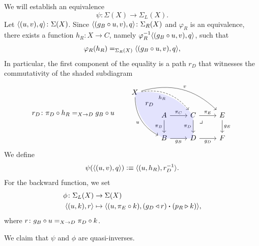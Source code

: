 \begin{solution}
    We will establish an equivalence
    \[
        \psi\colon\Sigma(X)\to\Sigma_L(X).
    \]
    Let $\dep{(u,v),q}\colon\Sigma(X)$. Since $\dep{(g_B\circ u,v),q}\colon\Sigma_R(X)$ and $\varphi_R$ is an equivalence, there exists a function $h_R\colon X\to C$, namely $\varphi_R^{-1}\langle(g_B\circ u,v),q\rangle$, such that
    \[
        \varphi_R(h_R)\mathrel{=_{\Sigma_R(X)}}\langle(g_B\circ u,v),q\rangle,
    \]
    In particular, the first component of the equality is a path $r_D$ that witnesses the commutativity of the shaded subdiagram
    \[
        r_D\colon \pi_D\circ h_R\eq{X\to D}g_B\circ u
    \qquad
        \begin{tikzcd}[
            execute at end picture=
                {
                \fill[blue,opacity=0.1]
                  (\tikzcdmatrixname-1-1.center) to[bend right]
                  (\tikzcdmatrixname-3-2.center) --
                  (\tikzcdmatrixname-3-3.center) --
                  (\tikzcdmatrixname-2-3.center) to[bend right] cycle;
                }]
            X
                    \arrow[rd,"r_D",phantom,description]
                    \arrow[rdd,"u"',bend right]
                    \arrow[rrrd,"v",bend left]
                    \arrow[rrd,"h_R"',bend left,dashed]\\
                &A
                    \arrow[r,"\pi_C"]
                    \arrow[d,"\pi_B"']
                &C
                    \arrow[r,"\pi_E"]
                    \arrow[d,"\pi_D"']
                    \arrow[rd,
                        "\lrcorner",
                        phantom,
                        very near start]
                &E
                    \arrow[d,"g_E"]\\
                &B
                    \arrow[r,"g_B"']
                &D
                    \arrow[r,"g_D"']
                &F
        \end{tikzcd}
    \]
    We define
    \[
        \psi(\langle(u,v),q\rangle)\mathrel{\vcentcolon}\equiv\langle(u,h_R),r_D^{-1}\rangle.
    \]
    For the backward function, we set
    \begin{align*}
        \phi\colon\Sigma_L(X)&\to\Sigma(X)\\
        \dep{(u,k),r}&\mapsto
            \dep{
                (u,\pi_E\circ k),
                (g_D\lwct r)\ct(p_R\rwct k)
            },
    \end{align*}
    where $r\colon g_B\circ u\eq{X\to D}\pi_D\circ k$.
    
    We claim that $\psi$ and $\phi$ are quasi-inverses.
    

\end{solution}
